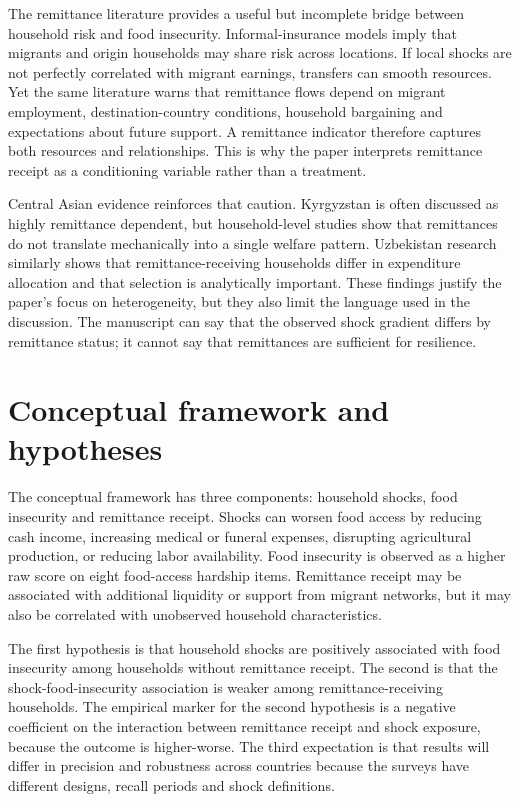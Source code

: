 \documentclass[11pt]{article}
\begin{document}
The remittance literature provides a useful but incomplete bridge between household risk and food insecurity. Informal-insurance models imply that migrants and origin households may share risk across locations. If local shocks are not perfectly correlated with migrant earnings, transfers can smooth resources. Yet the same literature warns that remittance flows depend on migrant employment, destination-country conditions, household bargaining and expectations about future support. A remittance indicator therefore captures both resources and relationships. This is why the paper interprets remittance receipt as a conditioning variable rather than a treatment.

Central Asian evidence reinforces that caution. Kyrgyzstan is often discussed as highly remittance dependent, but household-level studies show that remittances do not translate mechanically into a single welfare pattern. Uzbekistan research similarly shows that remittance-receiving households differ in expenditure allocation and that selection is analytically important. These findings justify the paper's focus on heterogeneity, but they also limit the language used in the discussion. The manuscript can say that the observed shock gradient differs by remittance status; it cannot say that remittances are sufficient for resilience.

\section{Conceptual framework and hypotheses}

The conceptual framework has three components: household shocks, food insecurity and remittance receipt. Shocks can worsen food access by reducing cash income, increasing medical or funeral expenses, disrupting agricultural production, or reducing labor availability. Food insecurity is observed as a higher raw score on eight food-access hardship items. Remittance receipt may be associated with additional liquidity or support from migrant networks, but it may also be correlated with unobserved household characteristics.

The first hypothesis is that household shocks are positively associated with food insecurity among households without remittance receipt. The second is that the shock-food-insecurity association is weaker among remittance-receiving households. The empirical marker for the second hypothesis is a negative coefficient on the interaction between remittance receipt and shock exposure, because the outcome is higher-worse. The third expectation is that results will differ in precision and robustness across countries because the surveys have different designs, recall periods and shock definitions.
\end{document}
